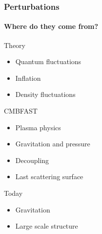 \documentclass{beamer}
\begin{document}
	\begin{frame}
		\frametitle{Perturbations}
		\framesubtitle{Where do they come from?}
		\begin{block}{Theory}
			\begin{itemize}
				\item Quantum fluctuations 
				\item Inflation
				\item Density fluctuations
			\end{itemize}
		\end{block}
		\begin{block}{CMBFAST}
			\begin{itemize}
				\item Plasma physics
				\item Gravitation and pressure
				\item Decoupling
				\item Last scattering surface
			\end{itemize}
		\end{block}
		\begin{block}{Today}
			\begin{itemize}
				\item Gravitation
				\item Large scale structure
			\end{itemize}
		\end{block}
	\end{frame}
\end{document}
